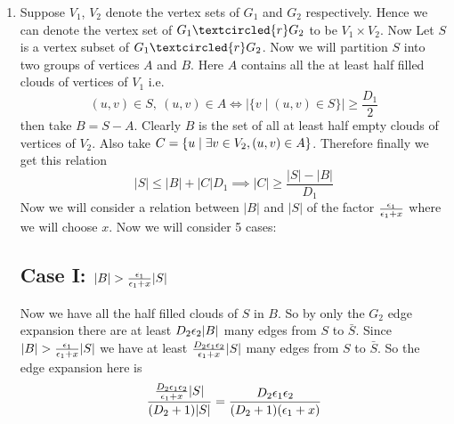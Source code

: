 \documentclass[a4paper, 11pt]{article}
\begin{document}
{\begin{enumerate}
	\textbf{\textit{Proof:}} Let $P_k$ denote the matrix  $$P_k=\mat{0& 1\\ I_{k-1} & 0}$$The the adjacency matrix of $k$-cycle is just $M=P_k+P_k^T$. Since $P_k$ is unitary matrix Let $S$ be the matrix such that $SP_kS^{\dagger}$ is diagonalized. Let's denote that $D$.  Then $$SMS^{\dagger}=S(P_k+P_k^{\dagger})S^{\dagger}=SP_kS^{\dagger}+SP_k^{\dagger}S^{\dagger}=D+S(SP_k)^{\dagger}=D+(SP_kS^{\dagger})^{\dagger}=D+D^{\dagger}$$Hence the eigenvalues of $M$ are $2\Re(\om^j)$ for all $j\in [n]$ where $\om = e^{\frac{2\pi i}{k}}$
	
	Now the normalized adjacency matrix for the $k$-cycle is $\frac12M$. Hence the eigenvalues for the normalized adjacency matrix are $\Re(\om^j)=\cos\frac{2j\pi}{k}$ for all $j\in [k]$. Hence the second largest eigenvalue is when $j=1$ i.e.  $$ \cos\frac{2\pi}{k}\geq 1-\frac12\lt(\frac{2\pi}{k}\rt)^2=1-\frac{2\pi^2}{k^2}=1-\frac{1}{\Theta(k^2)}$$Therefore $k$-cycle is $1-\frac{1}{\Theta(k^2)}$ expander. \qed
	
	\parinn Now we will show an explicit construction of degree 3 expanders from an constant degree expanders. Let $G$ be an $(N,D,\lm)$-expander. Take $H$ to be a $D$-cycle. Hence by the Lemma 2 we have $H$ is a $\lt(D,2,1-\frac1{\Theta(D^2)}\rt)$-expander. Take the graph $G'=G\textcircled{r}H$. $G'$ is a $3$ regular graph. Hence $G'$ is a $(ND,3,\lm')$-expander where $1-\lm'>0$ by part (1). Hence $G'$ is a degree 3 expander.
	
	\item Suppose $V_1$, $V_2$ denote the vertex sets of $G_1$ and $G_2$ respectively. Hence we can denote the vertex set of $G_1\textcircled{r} G_2$ to be $V_1\times V_2$. Now Let $S$ is a vertex subset of $G_1\textcircled{r}G_2$. Now we will partition $S$ into two groups of vertices $A$ and $B$. Here $A$ contains all the at least half filled clouds of vertices of $V_1$ i.e. $$(u,v)\in S,\ (u,v)\in A\iff |\{v\mid (u,v)\in S\}|\geq \frac{D_1}2$$ then take $B=S-A$. Clearly $B$ is the set of all at least half empty clouds of vertices of $V_2$. Also take $C=\{u\mid \exists v\in V_2, (u,v)\in A\}$. Therefore finally we get this relation $$|S|\leq |B|+|C|D_1\implies |C|\geq \frac{|S|-|B|}{D_1}$$Now we will consider a relation between $|B|$ and $|S|$ of the factor $\frac{\epsilon_1}{\epsilon_1+x}$ where we will choose $x$. Now we will consider 5 cases:
	\subsection*{Case I: $|B|>\frac{\eps_1}{\eps_1+x}|S|$}
	Now we have all the half filled clouds of $S$ in $B$. So by only the $G_2$ edge expansion there are at least $D_2\epsilon_2|B|$ many edges from $S$ to $\bar{S}$. Since $|B|>\frac{\eps_1}{\eps_1+x}|S|$ we have at least $\frac{D_2\epsilon_1\epsilon_2}{\epsilon_1+x}|S|$ many edges from $S$ to $\bar{S}$. So the edge expansion here is $$\frac{\frac{D_2\epsilon_1\epsilon_2}{\epsilon_1+x}|S|}{(D_2+1)|S|}=\frac{D_2\epsilon_1\epsilon_2}{(D_2+1)(\epsilon_1+x)}$$

\end{enumerate}}
\end{document}
